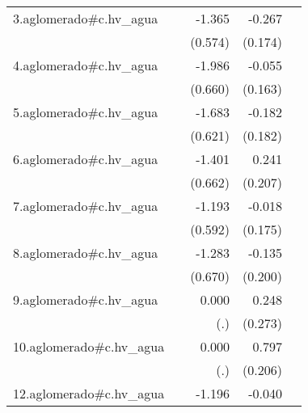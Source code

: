{\begin{longtable}{l*{4}{D{.}{.}{-1}}}
\addlinespace
3.aglomerado#c.hv\_agua&                     &      -1.365\sym{*}  &      -0.267         &                     \\
            &                     &     (0.574)         &     (0.174)         &                     \\
\addlinespace
4.aglomerado#c.hv\_agua&                     &      -1.986\sym{**} &      -0.055         &                     \\
            &                     &     (0.660)         &     (0.163)         &                     \\
\addlinespace
5.aglomerado#c.hv\_agua&                     &      -1.683\sym{**} &      -0.182         &                     \\
            &                     &     (0.621)         &     (0.182)         &                     \\
\addlinespace
6.aglomerado#c.hv\_agua&                     &      -1.401\sym{*}  &       0.241         &                     \\
            &                     &     (0.662)         &     (0.207)         &                     \\
\addlinespace
7.aglomerado#c.hv\_agua&                     &      -1.193\sym{*}  &      -0.018         &                     \\
            &                     &     (0.592)         &     (0.175)         &                     \\
\addlinespace
8.aglomerado#c.hv\_agua&                     &      -1.283         &      -0.135         &                     \\
            &                     &     (0.670)         &     (0.200)         &                     \\
\addlinespace
9.aglomerado#c.hv\_agua&                     &       0.000         &       0.248         &                     \\
            &                     &         (.)         &     (0.273)         &                     \\
\addlinespace
10.aglomerado#c.hv\_agua&                     &       0.000         &       0.797\sym{***}&                     \\
            &                     &         (.)         &     (0.206)         &                     \\
\addlinespace
12.aglomerado#c.hv\_agua&                     &      -1.196\sym{*}  &      -0.040         &                     \\

\end{longtable}}
